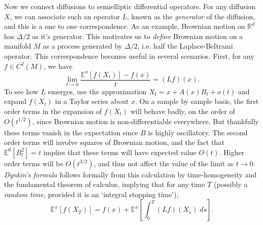 \documentclass[12pt]{article}
\newcommand*{\R}{\mathbb{R}}
\begin{document}
Now we connect diffusions to semielliptic differential operators. For any diffusion $X$, we can associate such an operator $L$, known as the \emph{generator} of the diffusion, and this is a one to one correspondence. As an example, Brownian motion on $\R^d$ has $\Delta / 2$ as it's generator. This motivates us to \emph{define} Brownian motion on a manifold $M$ as a process generated by $\Delta/2$, i.e. half the Laplace-Beltrami operator. This correspondence becomes useful in several scenarios. First, for any $f \in C^2(M)$, we have
%
\[ \lim_{t \to 0} \frac{\mathbb{E}^x[f(X_t)] - f(x)}{t} = (Lf)(x). \]
%
To see how $L$ emerges, use the approximation $X_t = x + A(x) B_t + o(t)$ and expand $f(X_t)$ in a Taylor series about $x$. On a sample by sample basis, the first order terms in the expansion of $f(X_t)$ will behave badly, on the order of $O(t^{1/2})$, since Brownian motion is non-differentiable everywhere. But thankfully these terms vanish in the expectation since $B$ is highly oscillatory. The second order terms will involve squares of Brownian motion, and the fact that $\mathbb{E}^0[B_t^2] = t$ implies that these terms will have expected value $O(t)$. Higher order terms will be $O(t^{3/2})$, and thus not affect the value of the limit as $t \to 0$.
%
%
%
\emph{Dynkin's formula} follows formally from this calculation by time-homogeneity and the fundamental theorem of calculus, implying that for any time $T$ (possibly a \emph{random time}, provided it is an `integral stopping time'),
%
\[ \mathbb{E}^x[f(X_T)] = f(x) + \mathbb{E}^x \left[ \int_0^T (Lf)(X_s)\; ds \right]. \]
\end{document}
